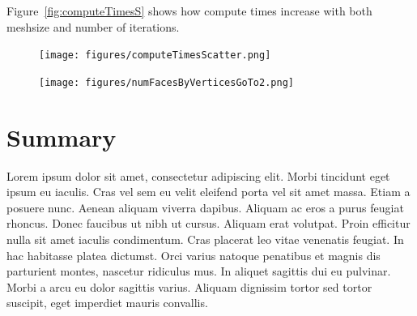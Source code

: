 Figure~\ref{fig:computeTimesS} shows how compute times increase with both meshsize and number of iterations. 
\begin{figure}[ht]
	\centering
	\texttt{[image: figures/computeTimesScatter.png]}
\end{figure}

\begin{figure}[ht]
	\centering
	\texttt{[image: figures/numFacesByVerticesGoTo2.png]}
\end{figure}





\section{Summary}
Lorem ipsum dolor sit amet, consectetur adipiscing elit. Morbi tincidunt eget 
ipsum eu iaculis. Cras vel sem eu velit eleifend porta vel sit amet massa. Etiam 
a posuere nunc. Aenean aliquam viverra dapibus. Aliquam ac eros a purus feugiat 
rhoncus. Donec faucibus ut nibh ut cursus. Aliquam erat volutpat. Proin efficitur 
nulla sit amet iaculis condimentum. Cras placerat leo vitae venenatis feugiat. In 
hac habitasse platea dictumst. Orci varius natoque penatibus et magnis dis 
parturient montes, nascetur ridiculus mus. In aliquet sagittis dui eu pulvinar. 
Morbi a arcu eu dolor sagittis varius. Aliquam dignissim tortor sed tortor 
suscipit, eget imperdiet mauris convallis.
